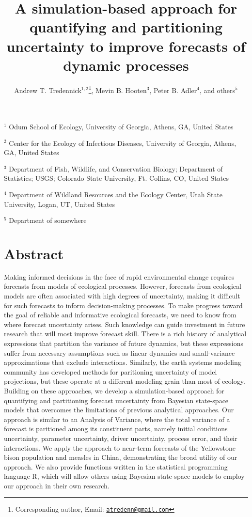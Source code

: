 \documentclass[12pt,]{article}
\title{A simulation-based approach for quantifying and partitioning uncertainty
to improve forecasts of dynamic processes}
\author{Andrew T. Tredennick\(^{1,2}\)\footnote{Corresponding author, Email:
  \href{mailto:atredenn@gmail.com}{\nolinkurl{atredenn@gmail.com}}},
Mevin B. Hooten\(^3\), Peter B. Adler\(^4\), and others\(^{5}\)}
\date{}
\begin{document}
\maketitle

\newcommand{\smalltodo}[2][]
    {\todo[caption={#2}, #1]
    {\begin{spacing}{0.5}#2\end{spacing}}}\setlength{\abovedisplayskip}{0pt}\raggedright\setlength{\parindent}{36pt}

\noindent{}\(^1\) Odum School of Ecology, University of Georgia, Athens,
GA, United States

\noindent{}\(^2\) Center for the Ecology of Infectious Diseases,
University of Georgia, Athens, GA, United States

\noindent{}\(^3\) Department of Fish, Wildlife, and Conservation
Biology; Department of Statistics; USGS; Colorado State University, Ft.
Collins, CO, United States

\noindent{}\(^4\) Department of Wildland Resources and the Ecology
Center, Utah State University, Logan, UT, United States

\noindent{}\(^5\) Department of somewhere

\hypertarget{abstract}{%
\section{Abstract}\label{abstract}}

Making informed decisions in the face of rapid environmental change
requires forecasts from models of ecological processes. However,
forecasts from ecological models are often associated with high degrees
of uncertainty, making it difficult for such forecasts to inform
decision-making processes. To make progress toward the goal of reliable
and informative ecological forecasts, we need to know from where
forecast uncertainty arises. Such knowledge can guide investment in
future research that will most improve forecast skill. There is a rich
history of analytical expressions that partition the variance of future
dynamics, but these expressions suffer from necessary assumptions such
as linear dynamics and small-variance approximations that exclude
interactions. Similarly, the earth systems modeling community has
developed methods for paritioning uncertainty of model projections, but
these operate at a different modeling grain than most of ecology.
Building on these approaches, we develop a simulation-based approach for
quantifying and partitioning forecast uncertainty from Bayesian
state-space models that overcomes the limitations of previous analytical
approaches. Our approach is similar to an Analysis of Variance, where
the total variance of a forecast is paritioned among its constituent
parts, namely initial conditions uncertainty, parameter uncertainty,
driver uncertainty, process error, and their interactions. We apply the
approach to near-term forecasts of the Yellowstone bison population and
measles in China, demonstrating the broad utility of our approach. We
also provide functions written in the statistical programming language
R, which will allow others using Bayesian state-space models to employ
our approach in their own research.
\end{document}
